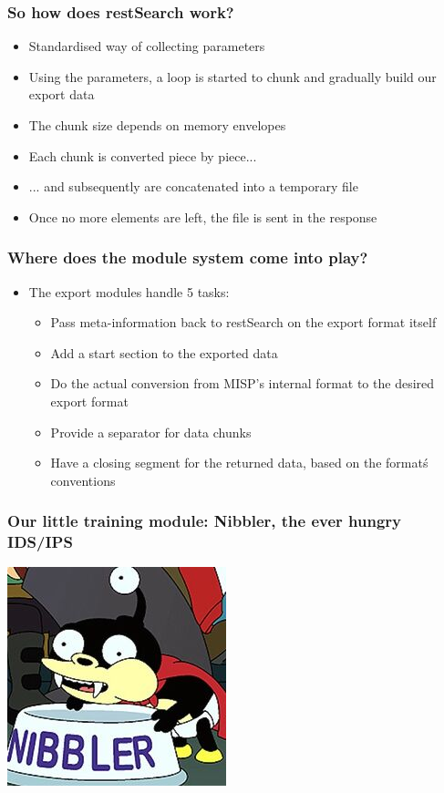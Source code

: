 \begin{frame}
  \frametitle{So how does restSearch work?}
  \begin{itemize}
    \item Standardised way of collecting parameters
    \item Using the parameters, a loop is started to chunk and gradually build our export data
    \item The chunk size depends on memory envelopes
    \item Each chunk is converted piece by piece...
    \item ... and subsequently are concatenated into a temporary file
    \item Once no more elements are left, the file is sent in the response
  \end{itemize}
\end{frame}

\begin{frame}
  \frametitle{Where does the module system come into play?}
  \begin{itemize}
    \item The export modules handle 5 tasks:
    \begin{itemize}
      \item Pass meta-information back to restSearch on the export format itself
      \item Add a start section to the exported data
      \item Do the actual conversion from MISP's internal format to the desired export format
      \item Provide a separator for data chunks
      \item Have a closing segment for the returned data, based on the format\'s conventions
    \end{itemize}
  \end{itemize}
\end{frame}

\begin{frame}
  \frametitle{Our little training module: Nibbler, the ever hungry IDS/IPS}
  \begin{center}
    \includegraphics[scale=0.5]{nibbler.jpg}
  \end{center}
\end{frame}

